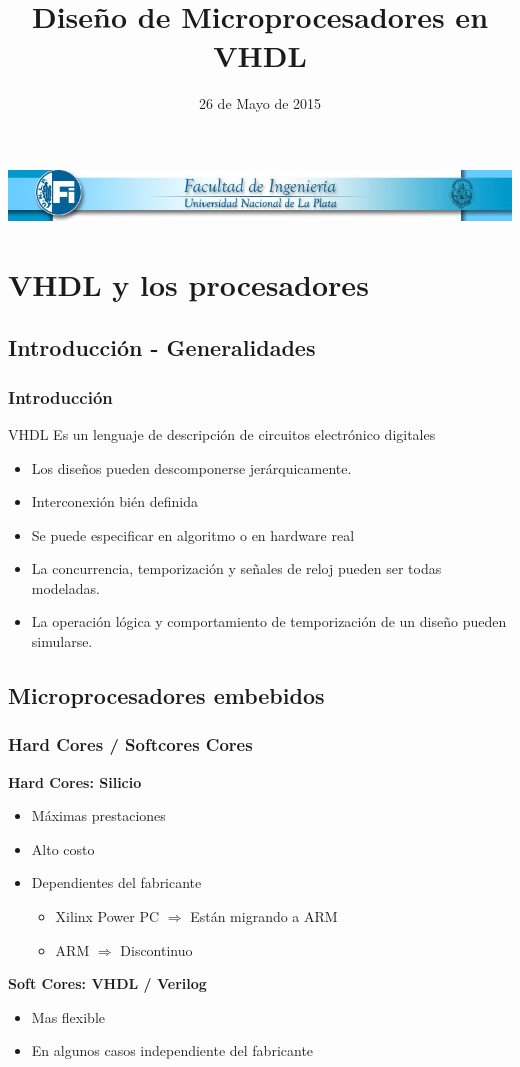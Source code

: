 \documentclass{beamer}
\title[Microprocesadores en VHDL]{Diseño de Microprocesadores en VHDL}
\date{26 de Mayo de 2015}
\begin{document}
\begin{frame}
\includegraphics[width=1\textwidth]{graficos/encabezado.jpg} 
\titlepage %

\end{frame}
\section{VHDL y los procesadores}
\subsection{Introducción - Generalidades}
\begin{frame}
\frametitle{Introducción}
\begin{block}{VHDL}
Es un lenguaje de descripción de circuitos electrónico digitales
\end{block}
\begin{itemize}
 \item Los diseños pueden descomponerse jerárquicamente.
 \item Interconexión bién definida
 \item Se puede especificar en algoritmo o en hardware real
 \item La concurrencia, temporización y señales de reloj pueden ser todas modeladas.
 \item La operación lógica y comportamiento de temporización de un diseño pueden simularse.
\end{itemize}
\end{frame}

\subsection{Microprocesadores embebidos}
\begin{frame}
\frametitle{Hard Cores / Softcores Cores}
\textbf{Hard Cores: Silicio}
\begin{itemize}
 \item Máximas prestaciones
 \item Alto costo
 \item Dependientes del fabricante
 \begin{itemize}
  \item Xilinx Power PC $\Rightarrow$ Están migrando a ARM
  \item ARM $\Rightarrow$ Discontinuo  
 \end{itemize}
\end{itemize}
\textbf{Soft Cores: VHDL / Verilog}
\begin{itemize}
 \item Mas flexible
 \item En algunos casos independiente del fabricante
\end{itemize}
\end{frame}
\end{document}
